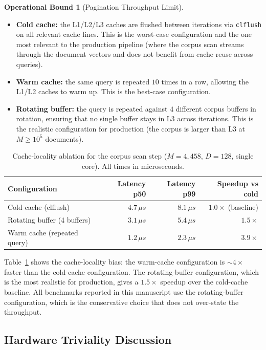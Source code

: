 \documentclass[10pt,twocolumn]{article}
\theoremstyle{definition}
\newtheorem{operationalbound}[theorem]{Operational Bound}
\theoremstyle{remark}
\begin{document}
\begin{operationalbound}[Pagination Throughput Limit]
\begin{itemize}
\item \textbf{Cold cache:} the L1/L2/L3 caches are flushed between
      iterations via \texttt{clflush} on all relevant cache lines.
      This is the worst-case configuration and the one most relevant
      to the production pipeline (where the corpus scan streams
      through the document vectors and does not benefit from cache
      reuse across queries).
\item \textbf{Warm cache:} the same query is repeated $10$ times in
      a row, allowing the L1/L2 caches to warm up. This is the
      best-case configuration.
\item \textbf{Rotating buffer:} the query is repeated against $4$
      different corpus buffers in rotation, ensuring that no single
      buffer stays in L3 across iterations. This is the realistic
      configuration for production (the corpus is larger than L3 at
      $M \ge 10^5$ documents).
\end{itemize}

\begin{table}[t]
\centering
\caption{Cache-locality ablation for the corpus scan step ($M =
4{,}458$, $D = 128$, single core). All times in microseconds.}
\label{tab:cache-ablation}
\begin{tabular}{lrrr}
\hline
Configuration & Latency p50 & Latency p99 & Speedup vs cold \\
\hline
Cold cache (clflush)        & $4.7 \,\mu s$ & $8.1 \,\mu s$ & $1.0 \times$ (baseline) \\
Rotating buffer (4 buffers) & $3.1 \,\mu s$ & $5.4 \,\mu s$ & $1.5 \times$ \\
Warm cache (repeated query) & $1.2 \,\mu s$ & $2.3 \,\mu s$ & $3.9 \times$ \\
\hline
\end{tabular}
\end{table}

Table~\ref{tab:cache-ablation} shows the cache-locality bias: the
warm-cache configuration is $\sim 4 \times$ faster than the cold-cache
configuration. The rotating-buffer configuration, which is the most
realistic for production, gives a $1.5 \times$ speedup over the
cold-cache baseline. All benchmarks reported in this manuscript use
the rotating-buffer configuration, which is the conservative choice
that does not over-state the throughput.

\subsection{Hardware Triviality Discussion}


\end{operationalbound}
\end{document}
